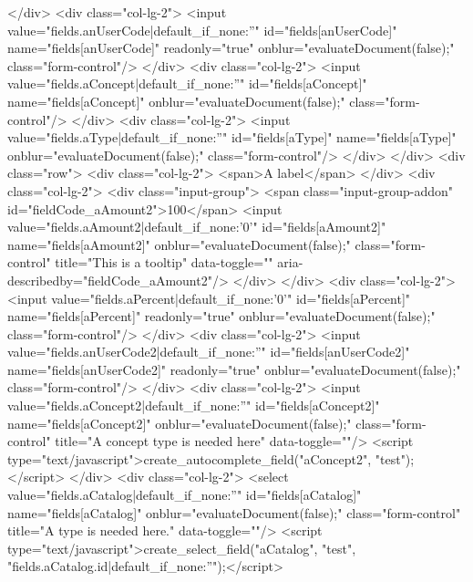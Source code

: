 {{{{{{{{{{{{{{{{{{{{{{{{{{                </div>
                <div class="col-lg-2">
                  <input value="{{fields.anUserCode|default_if_none:''}}" id="fields[anUserCode]" name="fields[anUserCode]" readonly="true" onblur="evaluateDocument(false);" class="form-control"/>
                </div>
                <div class="col-lg-2">
                  <input value="{{fields.aConcept|default_if_none:''}}" id="fields[aConcept]" name="fields[aConcept]" onblur="evaluateDocument(false);" class="form-control"/>
                </div>
                <div class="col-lg-2">
                  <input value="{{fields.aType|default_if_none:''}}" id="fields[aType]" name="fields[aType]" onblur="evaluateDocument(false);" class="form-control"/>
                </div>
              </div>
              <div class="row">
                <div class="col-lg-2">
                  <span>A label</span>
                </div>
                <div class="col-lg-2">
                  <div class="input-group">
                    <span class="input-group-addon" id="fieldCode_aAmount2">100</span>
                    <input value="{{fields.aAmount2|default_if_none:'0'}}" id="fields[aAmount2]" name="fields[aAmount2]" onblur="evaluateDocument(false);" class="form-control" title="This is a tooltip" data-toggle="" aria-describedby="fieldCode_aAmount2"/>
                  </div>
                </div>
                <div class="col-lg-2">
                  <input value="{{fields.aPercent|default_if_none:'0'}}" id="fields[aPercent]" name="fields[aPercent]" readonly="true" onblur="evaluateDocument(false);" class="form-control"/>
                </div>
                <div class="col-lg-2">
                  <input value="{{fields.anUserCode2|default_if_none:''}}" id="fields[anUserCode2]" name="fields[anUserCode2]" readonly="true" onblur="evaluateDocument(false);" class="form-control"/>
                </div>
                <div class="col-lg-2">
                  <input value="{{fields.aConcept2|default_if_none:''}}" id="fields[aConcept2]" name="fields[aConcept2]" onblur="evaluateDocument(false);" class="form-control" title="A concept type is needed here" data-toggle=""/>
                  <script type="text/javascript">create_autocomplete_field("aConcept2", "test");</script>
                </div>
                <div class="col-lg-2">
                  <select value="{{fields.aCatalog|default_if_none:''}}" id="fields[aCatalog]" name="fields[aCatalog]" onblur="evaluateDocument(false);" class="form-control" title="A type is needed here." data-toggle=""/>
                  <script type="text/javascript">create_select_field("aCatalog", "test", "{{fields.aCatalog.id|default_if_none:''}}");</script>
}}}}}}}}}}}}}}}}}}}}}}}}}}
